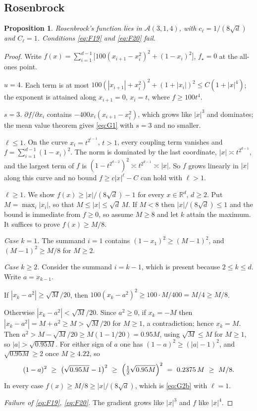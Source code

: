 \documentclass[pdflatex,sn-mathphys-num]{sn-jnl}
\theoremstyle{thmstyleone}
\newtheorem{proposition}[theorem]{Proposition}
\theoremstyle{thmstyletwo}
\theoremstyle{thmstylethree}
\begin{document}
\subsection{Rosenbrock}\label{sec:rosen}

\begin{proposition}\label{prop:rosen}
Rosenbrock's function lies in $\mathcal A(3,1,4)$, with $c_\ell=1/(8\sqrt d)$ and $C_\ell=1$. Conditions \eqref{eq:F19} and \eqref{eq:F20} fail.
\end{proposition}

\begin{proof}
Write $f(x)=\sum_{i=1}^{d-1}\bigl[100(x_{i+1}-x_i^2)^2+(1-x_i)^2\bigr]$, $f_\star=0$ at the all-ones point.

\emph{$u=4$.} Each term is at most $100(|x_{i+1}|+x_i^2)^2+(1+|x_i|)^2\le C(1+|x|^4)$; the exponent is attained along $x_{i+1}=0$, $x_i=t$, where $f\ge100t^4$.

\emph{$s=3$.} $\partial f/\partial x_i$ contains $-400x_i(x_{i+1}-x_i^2)$, which grows like $|x|^3$ and dominates; the mean value theorem gives \eqref{eq:G1} with $s=3$ and no smaller.

\emph{$\ell\le1$.} On the curve $x_i=t^{2^{i-1}}$, $t>1$, every coupling term vanishes and $f=\sum_{i=1}^{d-1}(1-x_i)^2$. The norm is dominated by the last coordinate, $|x|\asymp t^{2^{d-1}}$, and the largest term of $f$ is $(1-t^{2^{d-2}})^2\asymp t^{2^{d-1}}\asymp|x|$. So $f$ grows linearly in $|x|$ along this curve and no bound $f\ge c|x|^\ell-C$ can hold with $\ell>1$.

\emph{$\ell\ge1$.} We show $f(x)\ge|x|/(8\sqrt d)-1$ for every $x\in\mathbb R^d$, $d\ge2$. Put $M=\max_i|x_i|$, so that $M\le|x|\le\sqrt d\,M$. If $M<8$ then $|x|/(8\sqrt d)\le1$ and the bound is immediate from $f\ge0$, so assume $M\ge8$ and let $k$ attain the maximum. It suffices to prove $f(x)\ge M/8$.

\emph{Case $k=1$.} The summand $i=1$ contains $(1-x_1)^2\ge(M-1)^2$, and $(M-1)^2\ge M/8$ for $M\ge2$.

\emph{Case $k\ge2$.} Consider the summand $i=k-1$, which is present because $2\le k\le d$. Write $a=x_{k-1}$.

If $|x_k-a^2|\ge\sqrt M/20$, then $100(x_k-a^2)^2\ge100\cdot M/400=M/4\ge M/8$.

Otherwise $|x_k-a^2|<\sqrt M/20$. Since $a^2\ge0$, if $x_k=-M$ then $|x_k-a^2|=M+a^2\ge M>\sqrt M/20$ for $M\ge1$, a contradiction; hence $x_k=M$. Then $a^2>M-\sqrt M/20\ge M(1-1/20)=0.95M$, using $\sqrt M\le M$ for $M\ge1$, so $|a|>\sqrt{0.95M}$. For either sign of $a$ one has $(1-a)^2\ge(|a|-1)^2$, and $\sqrt{0.95M}\ge2$ once $M\ge4.22$, so
\[
(1-a)^2\ \ge\ \bigl(\sqrt{0.95M}-1\bigr)^2\ \ge\ \Bigl(\tfrac12\sqrt{0.95M}\Bigr)^2\ =\ 0.2375\,M\ \ge\ M/8 .
\]
In every case $f(x)\ge M/8\ge|x|/(8\sqrt d)$, which is \eqref{eq:G2b} with $\ell=1$.

\emph{Failure of \eqref{eq:F19}, \eqref{eq:F20}.} The gradient grows like $|x|^3$ and $f$ like $|x|^4$.
\end{proof}
\end{document}
